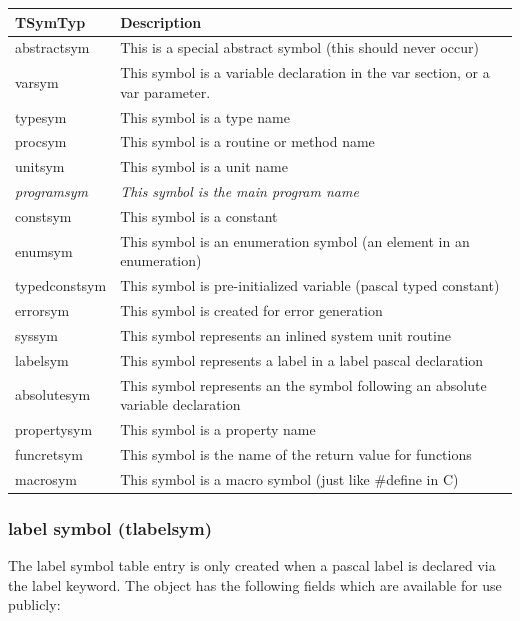 \documentclass [12pt]{article}
\begin{document}
\begin{longtable}{|l|p{10cm}|}
\hline
TSymTyp	& Description \\
\hline
\endhead
\hline
\endfoot
\textsf{abstractsym}& 
	This is a special abstract symbol (this should never occur) \\
\textsf{varsym}& 
	This symbol is a variable declaration in the \textsf{var} section, or a \textsf{var} parameter. \\
\textsf{typesym}& 
	This symbol is a type name \\
\textsf{procsym}& 
	This symbol is a routine or method name \\
\textsf{unitsym}& 
	This symbol is a unit name \\
\textsf{\textit{programsym}}& 
	\textit{This symbol is the main program name} \\
\textsf{constsym}& 
	This symbol is a constant \\
\textsf{enumsym}& 
	This symbol is an enumeration symbol (an element in an enumeration) \\
\textsf{typedconstsym}& 
	This symbol is pre-initialized variable (pascal typed constant) \\
\textsf{errorsym}& 
	This symbol is created for error generation \\
\textsf{syssym}& 
	This symbol represents an inlined system unit routine \\
\textsf{labelsym}& 
	This symbol represents a label in a \textsf{label} pascal declaration \\
\textsf{absolutesym}& 
	This symbol represents an the symbol following an \textsf{absolute} variable declaration \\
\textsf{propertysym}& 
	This symbol is a property name \\
\textsf{funcretsym}& 
	This symbol is the name of the return value for functions \\
\textsf{macrosym}& 
	This symbol is a macro symbol (just like {\#}define in C) 
\end{longtable}

\subsubsection{label symbol (tlabelsym)}
\label{subsubsec:label}

The label symbol table entry is only created when a pascal label is declared 
via the label keyword. The object has the following fields which are 
available for use publicly:
\end{document}
